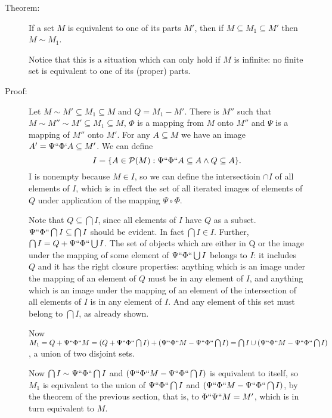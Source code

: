 \documentclass[12pt]{article}
\begin{document}
\begin{enumerate}
\begin{description}

\item[Theorem:]  If a set $M$ is equivalent to one of its parts $M'$, then if $M \subseteq M_1 \subseteq M'$ then $M \sim M_1$.

Notice that this is a situation which can only hold if $M$ is infinite:  no finite set is equivalent to one of its (proper) parts.

\item[Proof:]  Let $M \sim M' \subseteq M_1 \subseteq M$ and $Q = M_1-M'$.  There is $M''$ such that $M \sim M'' \sim M' \subseteq M_1 \subseteq M$, $\Phi$ is a mapping from
$M$ onto $M''$ and $\Psi$ is a mapping of $M''$ onto $M'$.  For any $A \subseteq M$ we have an image $A' =\Psi``\Phi`A \subseteq M'$.  We can define $$I = \{A \in {\cal P}(M):\Psi``\Phi``A \subseteq A \wedge Q \subseteq A\}.$$  I is nonempty because $M \in I$, so we can define the intersectioin $\cap I$ of all elements of $I$, which is in effect the set
of all iterated images of elements of $Q$ under application of the mapping $\Psi \circ \Phi$.

Note that $Q \subseteq \bigcap I$, since all elements of $I$ have $Q$ as a subset.  $\Psi``\Phi``\bigcap I \subseteq \bigcap I$ should be evident.  In fact $\bigcap I \in I$.
Further, $\bigcap I = Q + \Psi``\Phi``\bigcup I$.  The set of objects which are either in Q or the image under the mapping of some element of $\Psi``\Phi``\bigcup I$ belongs to $I$:  it includes $Q$ and it has the right closure properties:  anything which is an image under the mapping of an element of $Q$ must be in any element of $I$, and anything which is
an image under the mapping of an element of the intersection of all elements of $I$ is in any element of $I$.  And any element of this set must belong to $\bigcap I$, as already shown.

Now $M_1 = Q+\Psi``\Phi``M = (Q + \Psi``\Phi``\bigcap I) + (\Psi``\Phi``M - \Psi``\Phi``\bigcap I) = \bigcap I \cup  (\Psi``\Phi``M - \Psi``\Phi``\bigcap I)$,
a union of two disjoint sets.

Now $\bigcap I \sim \Psi``\Phi``\bigcap I$ and $(\Psi``\Phi``M - \Psi``\Phi``\bigcap I)$ is equivalent to itself, so $M_1$ is equivalent to the union of
$\Psi``\Phi``\bigcap I$  and $(\Psi``\Phi``M - \Psi``\Phi``\bigcap I)$, by the theorem of the previous section, that is, to $\Phi``\Psi``M = M'$, which is in turn equivalent to $M$.



\end{description}


\end{enumerate}
\end{document}
